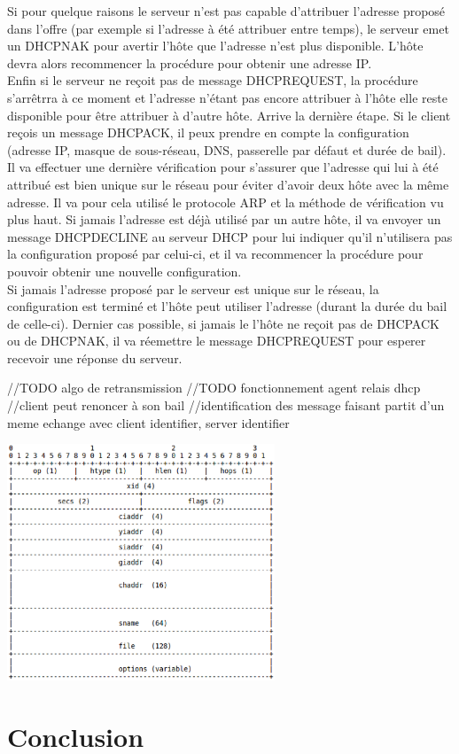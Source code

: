 \documentclass[twoside,openright,a4paper,11pt,french]{article}
\begin{document}
Si pour quelque raisons le serveur n'est pas capable d'attribuer l'adresse proposé dans l'offre (par exemple si l'adresse à été attribuer entre temps), le serveur emet un DHCPNAK pour avertir l'hôte que l'adresse n'est plus disponible. L'hôte devra alors recommencer la procédure pour obtenir une adresse IP.
\\Enfin si le serveur ne reçoit pas de message DHCPREQUEST, la procédure s'arrêtrra à ce moment et l'adresse n'étant pas encore attribuer à l'hôte elle reste disponible pour être attribuer à d'autre hôte.
Arrive la dernière étape. Si le client reçois un message DHCPACK, il peux prendre en compte la configuration (adresse IP, masque de sous-réseau, DNS, passerelle par défaut et durée de bail). Il va effectuer une dernière vérification pour s'assurer que l'adresse qui lui à été attribué est bien unique sur le réseau pour éviter d'avoir deux hôte avec la même adresse. Il va pour cela utilisé le protocole ARP et la méthode de vérification vu plus haut. Si jamais l'adresse est déjà utilisé par un autre hôte, il va envoyer un message DHCPDECLINE au serveur DHCP pour lui indiquer qu'il n'utilisera pas la configuration proposé par celui-ci, et il va recommencer la procédure pour pouvoir obtenir une nouvelle configuration.
\\Si jamais l'adresse proposé par le serveur est unique sur le réseau, la configuration est terminé et l'hôte peut utiliser l'adresse (durant la durée du bail de celle-ci).
Dernier cas possible, si jamais le l'hôte ne reçoit pas de DHCPACK ou de DHCPNAK, il va réemettre le message DHCPREQUEST pour esperer recevoir une réponse du serveur.

//TODO algo de retransmission
//TODO fonctionnement agent relais dhcp
//client peut renoncer à son bail
//identification des message faisant partit d'un meme echange avec client identifier, server identifier

\includegraphics[width=8cm]{./pics/paquet_dhcp.eps}




\section{Conclusion}
\label{sec:ccl}



\end{document}

